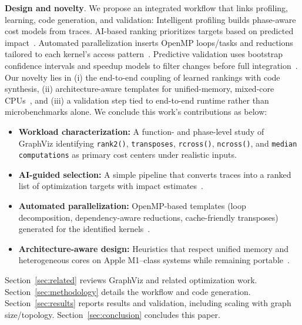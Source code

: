 \textbf{Design and novelty}. We propose an integrated workflow that links profiling, learning, code generation, and validation:
Intelligent profiling builds phase-aware cost models from traces.
AI-based ranking prioritizes targets based on predicted impact~\cite{ashouri2018survey,stephenson2003meta}.
Automated parallelization inserts OpenMP loops/tasks and reductions tailored to each kernel’s access pattern~\cite{cummins2017end}.
Predictive validation uses bootstrap confidence intervals and speedup models to filter changes before full integration~\cite{efron1979bootstrap}.
Our novelty lies in (i) the end-to-end coupling of learned rankings with code synthesis, (ii) architecture-aware templates for unified-memory, mixed-core CPUs~\cite{winarta2024analyzing}, and (iii) a validation step tied to end-to-end runtime rather than microbenchmarks alone.
We conclude this work's contributions as below:
\begin{itemize}
\item \textbf{Workload characterization:} A function- and phase-level study of GraphViz identifying \texttt{rank2()}, \texttt{transposes}, \texttt{rcross()}, \texttt{ncross()}, and \texttt{median computations} as primary cost centers under realistic inputs.
\item \textbf{AI-guided selection:} A simple pipeline that converts traces into a ranked list of optimization targets with impact estimates~\cite{ashouri2018survey}.
\item \textbf{Automated parallelization:} OpenMP-based templates (loop decomposition, dependency-aware reductions, cache-friendly transposes) generated for the identified kernels~\cite{cummins2017end}.
\item \textbf{Architecture-aware design:} Heuristics that respect unified memory and heterogeneous cores on Apple M1–class systems while remaining portable~\cite{winarta2024analyzing}.
\end{itemize}


Section~\ref{sec:related} reviews GraphViz and related optimization work. Section~\ref{sec:methodology} details the workflow and code generation. Section~\ref{sec:results} reports results and validation, including scaling with graph size/topology. Section~\ref{sec:conclusion} concludes this paper.



